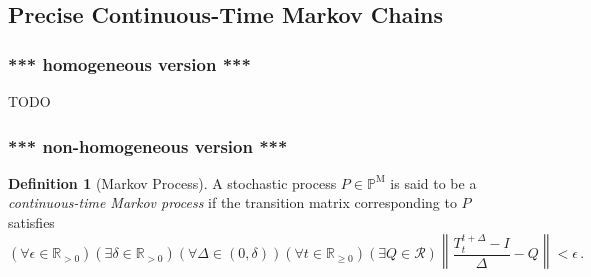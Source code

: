 \documentclass[10pt]{paper}
\theoremstyle{definition}
\newtheorem{corollary}[theorem]{Corollary}
\newtheorem{definition}{Definition}
\newcommand{\reals}{\mathbb{R}}
\newcommand{\realspos}{\reals_{>0}}
\newcommand{\realsnonneg}{\reals_{\geq 0}}
\newcommand{\processes}{\mathbb{P}}
\newcommand{\mprocesses}{\processes^{\mathrm{M}}}
\newcommand{\norm}[1]{\left\lVert #1 \right\rVert}
\begin{document}
%

\subsection{Precise Continuous-Time Markov Chains}

\subsubsection{*** homogeneous version ***}
TODO

\subsubsection{*** non-homogeneous version ***}

\begin{definition}[Markov Process]\label{def:markov_process}
A stochastic process $P\in\mprocesses$ is said to be a \emph{continuous-time Markov process} if the transition matrix corresponding to $P$ satisfies
\begin{equation*}
(\forall \epsilon\in\realspos)(\exists \delta\in\realspos)(\forall \Delta\in(0,\delta))(\forall t\in\realsnonneg)(\exists Q\in\mathcal{R}) \norm{\frac{T_t^{t+\Delta} - I}{\Delta} - Q} < \epsilon\,.
\end{equation*}
\end{definition}
\end{document}
